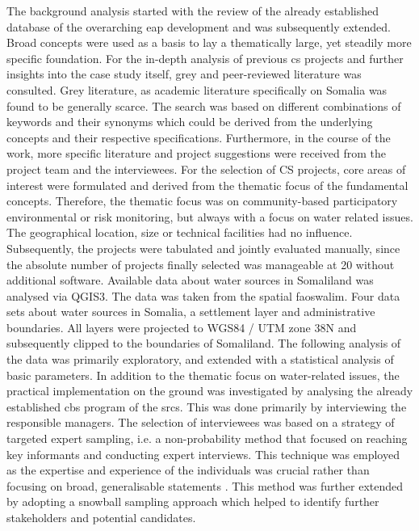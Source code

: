 The background analysis started with the review of the already established database of the overarching \acrshort{eap} development and was subsequently extended. Broad concepts were used as a basis to lay a thematically large, yet steadily more specific foundation. For the in-depth analysis of previous \acrshort*{cs} projects and further insights into the case study itself, grey and peer-reviewed literature was consulted. Grey literature, as academic literature specifically on Somalia was found to be generally scarce. The search was based on different combinations of keywords and their synonyms which could be derived from the underlying concepts and their respective specifications. Furthermore, in the course of the work, more specific literature and project suggestions were received from the project team and the interviewees. For the selection of CS projects, core areas of interest were formulated and derived from the thematic focus of the fundamental concepts. Therefore, the thematic focus was on community-based participatory environmental or risk monitoring, but always with a focus on water related issues. The geographical location, size or technical facilities had no influence. Subsequently, the projects were tabulated and jointly evaluated manually, since the absolute number of projects finally selected was manageable at 20 without additional software.\newline
Available data about water sources in Somaliland was analysed via QGIS3. The data was taken from the spatial \acrshort{fao}\acrshort{swalim}. Four data sets about water sources in Somalia, a settlement layer and administrative boundaries. All layers were projected to WGS84 / UTM zone 38N and subsequently clipped to the boundaries of Somaliland. The following analysis of the data was primarily exploratory, and extended with a statistical analysis of basic parameters.\newline %
In addition to the thematic focus on water-related issues, the practical implementation on the ground was investigated by analysing the already established \acrshort*{cbs} program of the \acrshort*{srcs}. This was done primarily by interviewing the responsible managers.
The selection of interviewees was based on a strategy of targeted expert sampling, i.e. a non-probability method that focused on reaching key informants and conducting expert interviews. This technique was employed as the expertise and experience of the individuals was crucial rather than focusing on broad, generalisable statements \autocite{pelzResearchMethodsSocial}. This method was further extended by adopting a snowball sampling approach which helped to identify further stakeholders and potential candidates.\newline
